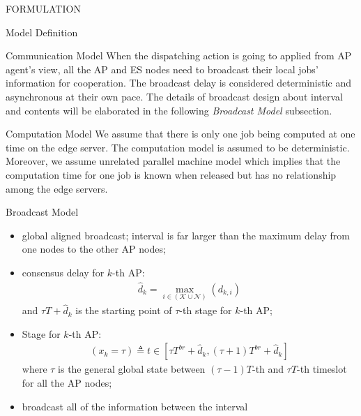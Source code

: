 \documentclass[10pt, conference, letterpaper]{IEEEtran}
\begin{document}
\begin{section}{FORMULATION}
\begin{subsection}{Model Definition}
\begin{subsubsection}{Communication Model}
                When the dispatching action is going to applied from AP agent's view, all the AP and ES nodes need to broadcast their local jobs' information for cooperation. The broadcast delay is considered deterministic and asynchronous at their own pace.
                The details of broadcast design about interval and contents will be elaborated in the following \textit{Broadcast Model} subsection.
            \end{subsubsection}

            \begin{subsubsection}{Computation Model}
                We assume that there is only one job being computed at one time on the edge server. The computation model is assumed to be deterministic.
                Moreover, we assume unrelated parallel machine model which implies that the computation time for one job is known when released but has no relationship among the edge servers.
            \end{subsubsection}

            \begin{subsubsection}{Broadcast Model}
                \begin{itemize}
                    \item global aligned broadcast; interval is far larger than the maximum delay from one nodes to the other AP nodes;
                    \item consensus delay for $k$-th AP:
                        \begin{align}
                            \hat{d}_k = \max_{i\in(\mathcal{K} \cup \mathcal{N})}(d_{k,i})
                        \end{align}
                        and $\tau T + \hat{d}_k$ is the starting point of $\tau$-th stage for $k$-th AP;
                    \item Stage for $k$-th AP:
                        \begin{align}
                            (x_k={\tau})\triangleq t \in [\tau T^{br}+\hat{d}_k, (\tau+1) T^{br}+\hat{d}_k]
                        \end{align}
                        where $\tau$ is the general global state between $(\tau-1) T$-th and $\tau T$-th timeslot for all the AP nodes;
                    \item broadcast all of the information between the interval
                \end{itemize}


\end{subsubsection}
\end{subsection}
\end{section}
\end{document}
